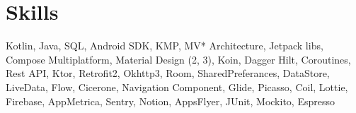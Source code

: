 \documentclass[a4paper,8pt]{article}
\begin{document}
\section{Skills}
Kotlin, Java, SQL, Android SDK, KMP, MV* Architecture, Jetpack libs, Compose Multiplatform, Material Design (2, 3), Koin, Dagger Hilt, Coroutines, Rest API, Ktor, Retrofit2, Okhttp3, Room, SharedPreferances, DataStore, LiveData, Flow, Cicerone, Navigation Component, Glide, Picasso, Coil, Lottie, Firebase, AppMetrica, Sentry, Notion, AppsFlyer, JUnit, Mockito, Espresso

\vfill
\end{document}
